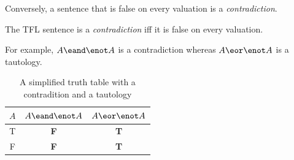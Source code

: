 \begin{table}[h]

  \label{tab:tt-neg-equivalences}
  \caption{Simplified truth tables demonstrating \textbf{LEM}, \textbf{LNC}, and \textbf{DN}}
\end{table}

Conversely, a sentence that is false on every valuation is a
\emph{contradiction}.

\begin{definition}[Contradiction]
  \label{def:tfl-contradiction}
  The TFL sentence \ephi is a \emph{contradiction} iff it is false on every
  valuation.
\end{definition}

For example, $A\eand\enot A$ is a contradiction whereas
$A\eor\enot A$ is a tautology.

\begin{table}[h]
  \begin{center}
    \begin{tabular}{c||c|c}
      $A$ & $A \eand \enot A$ & $A \eor \enot A$ \\
      \hline
      T & \textbf{F} & \textbf{T} \\
      F & \textbf{F} & \textbf{T}
    \end{tabular}
  \end{center}
  \label{tab:truth-table-example}
  \caption{A simplified truth table with a contradition and a tautology}
\end{table}

